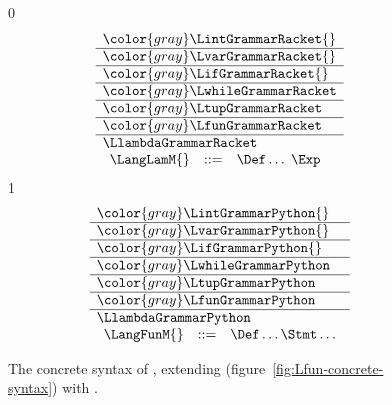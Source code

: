 \documentclass[7x10]{TimesAPriori_MIT}%
\newcommand{\gray}[1]{{\color{gray} #1}}
\def\racketEd{0}
\def\pythonEd{1}
\def\edition{0}
\numberwithin{theorem}{chapter}
\numberwithin{definition}{chapter}
\numberwithin{equation}{chapter}
\begin{document}
\begin{figure}[tp]
\centering
\begin{tcolorbox}[colback=white]
    \small
{\if\edition\racketEd
\[
\begin{array}{l}
  \gray{\LintGrammarRacket{}} \\ \hline
  \gray{\LvarGrammarRacket{}} \\ \hline
  \gray{\LifGrammarRacket{}} \\ \hline
  \gray{\LwhileGrammarRacket} \\ \hline
  \gray{\LtupGrammarRacket} \\   \hline
  \gray{\LfunGrammarRacket} \\   \hline
  \LlambdaGrammarRacket \\
  \begin{array}{lcl}
  \LangLamM{} &::=& \Def\ldots \; \Exp
  \end{array}
\end{array}
\]
\fi}
{\if\edition\pythonEd
\[
\begin{array}{l}
  \gray{\LintGrammarPython{}} \\ \hline
  \gray{\LvarGrammarPython{}} \\ \hline
  \gray{\LifGrammarPython{}} \\ \hline
  \gray{\LwhileGrammarPython} \\ \hline
  \gray{\LtupGrammarPython} \\   \hline
  \gray{\LfunGrammarPython} \\   \hline
  \LlambdaGrammarPython \\
  \begin{array}{lcl}
    \LangFunM{} &::=& \Def\ldots \Stmt\ldots
  \end{array}
\end{array}
\]
\fi}
\end{tcolorbox}
\caption{The concrete syntax of \LangLam{}, extending \LangFun{} (figure~\ref{fig:Lfun-concrete-syntax}) 
  with .}
\label{fig:Llam-concrete-syntax}
\end{figure}
\end{document}

